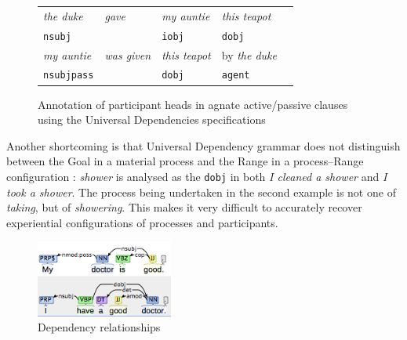 \begin{figure}[htb]
\centering 
\vspace{0.35cm}
    \begin{tabular}{lllll}

    \emph{the duke} & \emph{gave} & \emph{my auntie} & \emph{this teapot} \\
    \texttt{nsubj} & ~ & \texttt{iobj} & \texttt{dobj}  \vspace{0.5cm} \\
    \emph{my auntie} & \emph{was given} & \emph{this teapot} & by \emph{the duke} \\
    \texttt{nsubjpass} & ~ & \texttt{dobj} & \texttt{agent} \\

    \end{tabular}
    \caption[Universal dependency annotation]{Annotation of participant heads in agnate active\slash passive clauses using the Universal Dependencies specifications}
    \label{tab:duke-teapot-deps}
    \vspace{0.35cm}
\end{figure}


Another shortcoming is that Universal Dependency grammar does not distinguish between the Goal in a material process and the Range in a process--Range configuration \cite{halliday_introduction_2004}: \emph{shower} is analysed as the \texttt{dobj} in both \emph{I cleaned a shower} and \emph{I took a shower}. The process being undertaken in the second example is not one of \emph{taking}, but of \emph{showering}. This makes it very difficult to accurately recover experiential configurations of processes and participants.

\begin{figure}[htb]
\centering
\includegraphics[width=0.40\textwidth]{../images/dep_problem.png}
\caption{Dependency relationships}
\label{fig:dep_rel}
\end{figure}

